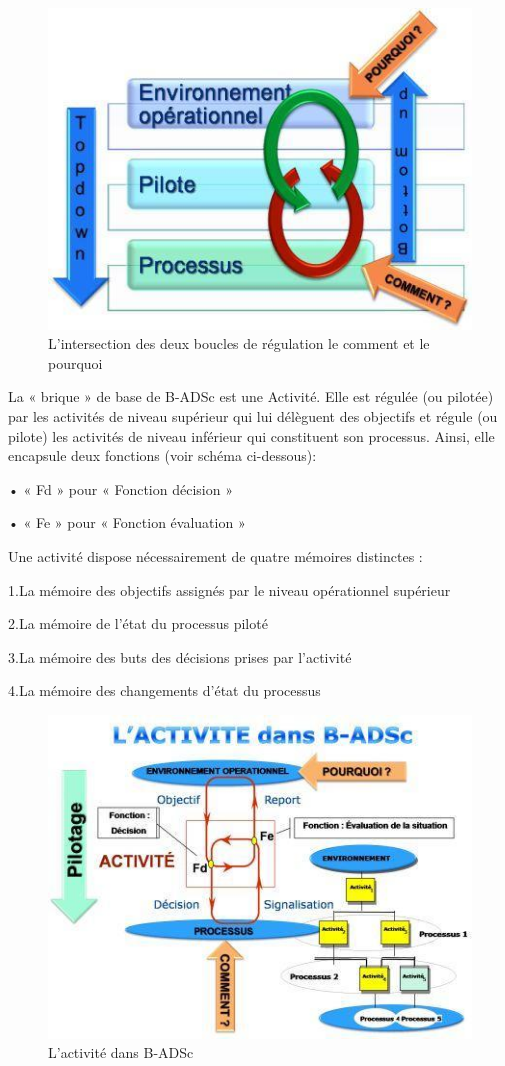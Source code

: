  \begin{figure}[H]
\begin{center}
\includegraphics[width=0.5\linewidth]{images/comment_pourquoi}
\end{center}
\caption{L'intersection des deux boucles de régulation le comment et le pourquoi}
\label{fig:10}
\end{figure}
La « brique » de base de B-ADSc est une Activité. Elle est régulée (ou pilotée) par les activités de niveau supérieur qui lui délèguent des objectifs et régule (ou pilote) les activités de niveau inférieur qui constituent son processus.
Ainsi, elle encapsule deux fonctions
(voir schéma ci-dessous):

• « Fd » pour « Fonction décision » 

• « Fe » pour « Fonction évaluation » 

Une activité dispose nécessairement de quatre mémoires distinctes :

1.La mémoire des objectifs assignés par le niveau opérationnel supérieur 

2.La mémoire de l'état du processus piloté 

3.La mémoire des buts des décisions prises par l’activité 

4.La mémoire des changements d’état du processus

 
 \begin{figure}[H]
\begin{center}
\includegraphics[width=1\linewidth]{images/activite}
\end{center}
\caption{L'activité dans B-ADSc}
\label{fig:11}
\end{figure}

